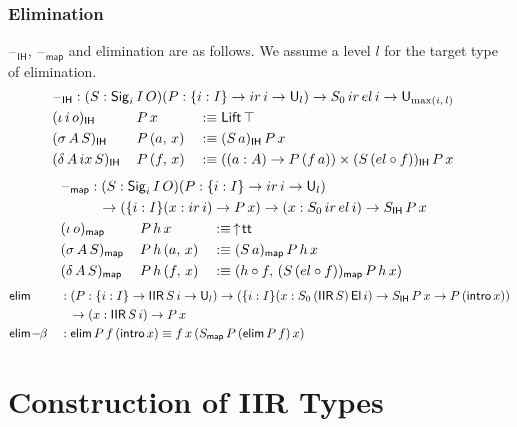 \documentclass[acmsmall,screen,review,anonymous]{acmart}
\newcommand{\msf}[1]{{\mathsf{#1}}}
\newcommand{\U}{\msf{U}}
\newcommand{\El}{\msf{El}}
\newcommand{\Lift}{\msf{Lift}}
\newcommand{\lup}{\uparrow}
\newcommand{\Sig}{\msf{Sig}}
\newcommand{\ttt}{\msf{tt}}
\newcommand{\blank}{{\mathord{\hspace{1pt}\text{--}\hspace{1pt}}}}
\newcommand{\ir}{{ir}}
\newcommand{\el}{{el}}
\newcommand{\ix}{{ix}}
\newcommand{\intro}{\msf{intro}}
\newcommand{\IH}{\msf{IH}}
\newcommand{\map}{\msf{map}}
\newcommand{\elim}{\msf{elim}}
\newcommand{\IIR}{\msf{IIR}}
\begin{document}
\subsubsection{Elimination}\label{sec:iir-elimination} $\blank_\IH$, $\blank_\map$ and elimination are
as follows. We assume a level $l$ for the target type of elimination.
\begin{alignat*}{3}
  &\rlap{$\blank_\IH : (S : \Sig_i\,I\,O)(P : \{i : I\}\to \ir\,i \to \U_l) \to S_0\,\ir\,\el\,i \to \U_{\max(i,\,l)}$} \\
  &(\iota\,i\,o)_\IH \,&&P\,x       &&:\equiv \Lift\,\top \\
  &(\sigma\,A\,S)_\IH\,&&P\,(a,\,x) &&:\equiv (S\,a)_\IH\,P\,x \\
  &(\delta\,A\,\ix\,S)_\IH\,&&P\,(f,\,x) &&:\equiv ((a : A) \to P\,(f\,a)) \times (S\,(\el \circ f))_\IH\,P\,x
\end{alignat*}
\begin{alignat*}{3}
  &\hspace{-3em}\rlap{$\blank_\map : (S : \Sig_i\,I\,O)(P : \{i : I\}\to \ir\,i \to \U_l)$}\\
  &\hspace{-3em}\rlap{$\hspace{3em}\to (\{i : I\}(x : \ir\,i) \to P\,x) \to (x : S_0\,\ir\,\el\,i) \to S_\IH\,P\,x$} \\
  &\hspace{-3em}(\iota\,o)_\map    \,&&P\,h\,x       &&:\equiv\,\lup\!\ttt \\
  &\hspace{-3em}(\sigma\,A\,S)_\map\,&&P\,h\,(a,\,x) &&:\equiv (S\,a)_\map\,P\,h\,x \\
  &\hspace{-3em}(\delta\,A\,S)_\map\,&&P\,h\,(f,\,x) &&:\equiv (h \circ f,\,(S\,(\el \circ f))_\map\,P\,h\,x)
\end{alignat*}
\begin{alignat*}{3}
  &\elim           &&: (P : \{i : I\}\to \IIR\,S\,i \to \U_l) \to (\{i : I\}(x : S_0\,(\IIR\,S)\,\El\,i) \to S_\IH\,P\,x \to P\,(\intro\,x))\\
  &                && \hspace{0.7em}\to (x : \IIR\,S\,i) \to P\,x \\
  &\elim\!-\!\!\beta &&: \elim\,P\,f\,(\intro\,x) \equiv f\,x\,(S_\map\,P\,(\elim\,P\,f)\,x)
\end{alignat*}


\section{Construction of IIR Types}
\end{document}
